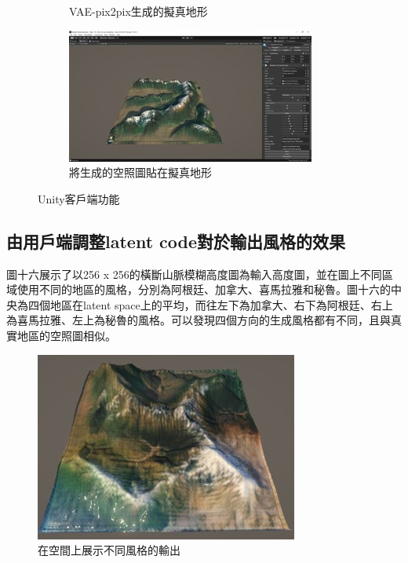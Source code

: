 \documentclass[a4paper, 12pt]{article}
\begin{document}
\begin{figure}
\begin{subfigure}[b]{0.475\textwidth}
        \caption[]%
        {{\small VAE-pix2pix生成的擬真地形}}
        \label{fig:15}
    \end{subfigure}
    \hfill
    \begin{subfigure}[b]{0.475\textwidth}
        \centering
        \includegraphics[width=\textwidth]{fig/16.jpg}
        \caption[]%
        {{\small 將生成的空照圖貼在擬真地形}}
        \label{fig:16}
    \end{subfigure}
    \caption[ The average and standard deviation of critical parameters ]
    {\small Unity客戶端功能}
    \label{fig:unity}
\end{figure}

\subsection{由用戶端調整latent code對於輸出風格的效果}
圖十六展示了以256 x 256的橫斷山脈模糊高度圖為輸入高度圖，並在圖上不同區域使用不同的地區的風格，分別為阿根廷、加拿大、喜馬拉雅和秘魯。圖十六的中央為四個地區在latent space上的平均，而往左下為加拿大、右下為阿根廷、右上為喜馬拉雅、左上為秘魯的風格。可以發現四個方向的生成風格都有不同，且與真實地區的空照圖相似。

\begin{figure}[htbp]
    \centering
    \includegraphics[width=0.7\linewidth]{fig/17.jpg}
    \caption{在空間上展示不同風格的輸出}
    \label{fig:17}
\end{figure}
\end{document}
